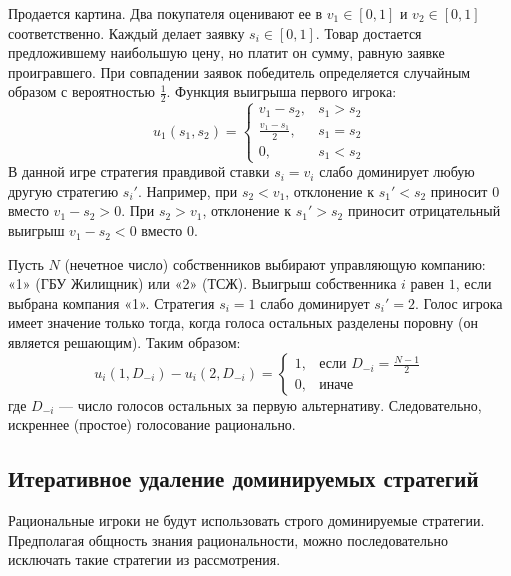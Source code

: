 \begin{example}
Продается картина. Два покупателя оценивают ее в $v_1 \in [0, 1]$ и $v_2 \in [0, 1]$ соответственно. Каждый делает заявку $s_i \in [0, 1]$. Товар достается предложившему наибольшую цену, но платит он сумму, равную заявке проигравшего. При совпадении заявок победитель определяется случайным образом с вероятностью $\frac{1}{2}$. 
Функция выигрыша первого игрока:
\begin{equation}
    u_1(s_1, s_2) =
    \begin{cases}
        v_1 - s_2, & s_1 > s_2 \\
        \frac{v_1 - s_1}{2}, & s_1 = s_2 \\
        0, & s_1 < s_2
    \end{cases}
\end{equation}
В данной игре стратегия правдивой ставки $s_i = v_i$ слабо доминирует любую другую стратегию $s_i'$. Например, при $s_2 < v_1$, отклонение к $s_1' < s_2$ приносит $0$ вместо $v_1 - s_2 > 0$. При $s_2 > v_1$, отклонение к $s_1' > s_2$ приносит отрицательный выигрыш $v_1 - s_2 < 0$ вместо $0$.
\end{example}

\begin{example}
Пусть $N$ (нечетное число) собственников выбирают управляющую компанию: «1» (ГБУ Жилищник) или «2» (ТСЖ). Выигрыш собственника $i$ равен $1$, если выбрана компания «1». Стратегия $s_i = 1$ слабо доминирует $s_i' = 2$. Голос игрока имеет значение только тогда, когда голоса остальных разделены поровну (он является решающим). Таким образом:
\begin{equation}
    u_i(1, D_{-i}) - u_i(2, D_{-i}) = 
    \begin{cases}
        1, & \text{если } D_{-i} = \frac{N-1}{2} \\
        0, & \text{иначе}
    \end{cases}
\end{equation}
где $D_{-i}$ — число голосов остальных за первую альтернативу. Следовательно, искреннее (простое) голосование рационально.
\end{example}

\subsection{Итеративное удаление доминируемых стратегий}

Рациональные игроки не будут использовать строго доминируемые стратегии. Предполагая общность знания рациональности, можно последовательно исключать такие стратегии из рассмотрения.

